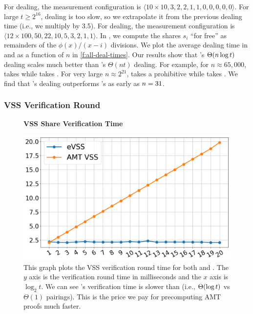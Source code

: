 For \evss dealing, the measurement configuration is $\langle 10 \times 10, 3, 2, 2, 1, 1, 0, 0, 0, 0, 0\rangle$.
For large $t\ge 2^{16}$, \evss dealing is too slow, so we extrapolate it from the previous dealing time (i.e., we multiply by 3.5).
For \ourvss dealing, the measurement configuration is $\langle12 \times 100, 50, 22, 10, 5, 3, 2, 1, 1\rangle$.
In \evss, we compute the shares $s_i$ ``for free'' as remainders of the $\phi(x) / (x-i)$ divisions.
We plot the average dealing time in \ourvss and \evss as a function of $n$ in \cref{f:all-deal-times}.
Our results show that \ourvss's $\Theta(n\log{t})$ dealing scales much better than \evss's $\Theta(nt)$ dealing.
For example, for $n\approx 65,000$, \evss takes  while \ourvss takes .
For very large $n\approx 2^{21}$, \evss takes a prohibitive  while \ourvss takes .
We find that \ourvss's dealing outperforms \evss's as early as $n=31$.

\subsubsection{VSS Verification Round}
\label{s:eval:vss:share-verif}

\begin{figure}[t]
    \centering
    \textbf{VSS Share Verification Time}\par\medskip
    \includegraphics[width=0.70\columnwidth]{figures-thresh/vss-verify-times.png}
    \caption{
        This graph plots the VSS verification round time for both \evss and \ourvss.
        The $y$ axis is the verification round time in milliseconds and the $x$ axis is $\log_2{t}$.
        We can see \ourvss's verification time is slower than \evss (i.e., $\Theta(\log{t})$ vs $\Theta(1)$ pairings).
        This is the price we pay for precomputing AMT proofs much faster.
    }
    \label{f:vss-verify-times}
\end{figure}

